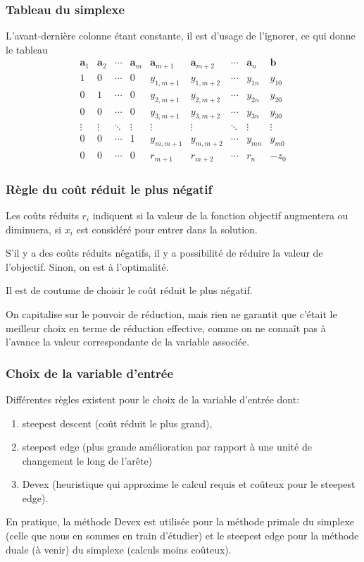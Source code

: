 \documentclass[t,usepdftitle=false]{beamer}
\def\ba{\boldsymbol{a}}
\def\bb{\boldsymbol{b}}
\begin{document}
\begin{frame}
\frametitle{Tableau du simplexe}

L'avant-dernière colonne étant constante, il est d'usage de l'ignorer, ce qui donne le tableau
$$
\begin{matrix}
	\ba_1 & \ba_2 & \cdots & \ba_m & \ba_{m+1} &
	\ba_{m+2} & \cdots & \ba_n & \bb \\
	1 & 0 & \cdots & 0 & y_{1,m+1} & y_{1,m+2} & \cdots & y_{1n} & y_{10} \\
	0 & 1 & \cdots & 0 & y_{2,m+1} & y_{2,m+2} & \cdots & y_{2n} & y_{20} \\
	0 & 0 & \cdots & 0 & y_{3,m+1} & y_{3,m+2} & \cdots & y_{3n} & y_{30} \\
	\vdots & \vdots & \ddots & \vdots & \vdots & \vdots & \ddots & \vdots & \vdots \\
	0 & 0 & \cdots & 1 & y_{m,m+1} & y_{m,m+2} & \cdots & y_{mn} & y_{m0} \\
	0 & 0 & \cdots & 0 & r_{m+1} & r_{m+2} & \cdots & r_n & -z_0
\end{matrix}
$$

\end{frame}

\begin{frame}
\frametitle{Règle du coût réduit le plus négatif}

Les coûts réduits $r_i$ indiquent si la valeur de la fonction objectif augmentera ou diminuera, si $x_i$ est considéré pour entrer dans la solution.

\mbox{}

S'il y a des coûts réduits négatifs, il y a possibilité de réduire la valeur de l'objectif. Sinon, on est à l'optimalité.

\mbox{}

Il est de coutume de choisir le coût réduit le plus négatif.

\mbox{}

On capitalise sur le pouvoir de réduction, mais rien ne garantit que c'était le meilleur choix en terme de réduction effective, comme on ne connaît pas à l'avance la valeur correspondante de la variable associée.

\end{frame}

\begin{frame}
\frametitle{Choix de la variable d'entrée}

Différentes règles existent pour le choix de la variable
d’entrée dont:
\begin{enumerate}
\item
steepest descent (coût réduit le plus grand),
\item
steepest edge (plus grande amélioration par rapport à une unité de changement le long de l'arête)
\item
Devex (heuristique qui approxime le calcul requis et coûteux pour le steepest edge).
\end{enumerate}
En pratique, la méthode Devex est utilisée pour la méthode primale du simplexe (celle que nous en sommes en train d'étudier) et le steepest edge pour la méthode duale (à venir) du simplexe
(calculs moins coûteux).

\end{frame}
\end{document}

